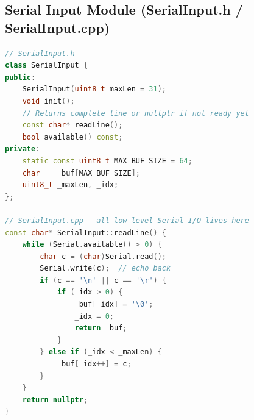 \subsection{Serial Input Module (SerialInput.h / SerialInput.cpp)}

\begin{lstlisting}[language=C++, caption={Serial line reader with echo --- encapsulates all raw Serial calls}]
// SerialInput.h
class SerialInput {
public:
    SerialInput(uint8_t maxLen = 31);
    void init();
    // Returns complete line or nullptr if not ready yet
    const char* readLine();
    bool available() const;
private:
    static const uint8_t MAX_BUF_SIZE = 64;
    char    _buf[MAX_BUF_SIZE];
    uint8_t _maxLen, _idx;
};

// SerialInput.cpp - all low-level Serial I/O lives here
const char* SerialInput::readLine() {
    while (Serial.available() > 0) {
        char c = (char)Serial.read();
        Serial.write(c);  // echo back
        if (c == '\n' || c == '\r') {
            if (_idx > 0) {
                _buf[_idx] = '\0';
                _idx = 0;
                return _buf;
            }
        } else if (_idx < _maxLen) {
            _buf[_idx++] = c;
        }
    }
    return nullptr;
}
\end{lstlisting}
